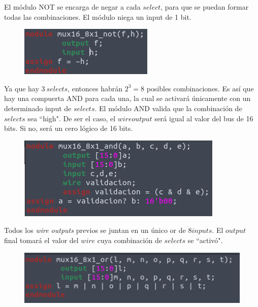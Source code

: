 \documentclass[11pt,a4paper]{article}
\begin{document}
\begin{enumerate}
\begin{enumerate}[label=(\alph*)]
El módulo NOT se encarga de negar a cada $select$, para que se puedan formar todas las combinaciones. El módulo niega un input de 1 bit.
\begin{figure}[h!]
\centering
\includegraphics[scale=0.5]{16_8x1MUX_3.png} 
\end{figure}

Ya que hay $3 \ selects$, entonces habrán $2^ 3= 8$ posibles combinaciones. Es así que hay una compuerta AND para cada una, la cual se activará únicamente con un determinado input de $selects$. El módulo AND valida que la combinación  de $selects$ sea ``high". De ser el caso, el $wire output$ será igual al valor del bus de 16 bits. Si no, será un cero lógico de 16 bits. 
\begin{figure}[h]
\centering
\includegraphics[scale=0.5]{16_8x1MUX_2.png} 
\end{figure}

Todos los \textit{wire outputs} previos se juntan en un único or de $8 inputs$. El $output$ final tomará el valor del $wire$ cuya combinación de $selects$ se ``activó".
\pagebreak 
\begin{figure}[h!]
\centering
\includegraphics[scale=0.7]{16_8x1MUX_1.png} 
\end{figure}


\end{enumerate}
\end{enumerate}
\end{document}
